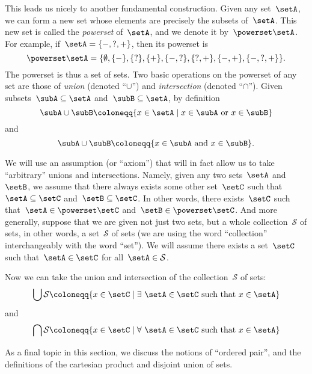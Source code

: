 {This leads us nicely to another fundamental construction.
Given any set~$\setA$, we can form a new set whose elements are precisely the subsets of~$\setA$.
This new set is called the \emph{powerset} of~$\setA$, and we denote it by~$\powerset \setA$.
For example, if~$\setA = \{ -, ?, + \}$, then its powerset is
\begin{equation}
\powerset \setA = \{ \emptyset, \{ - \}, \{ ? \}, \{ + \}, \{ -, ? \}, \{ ?, + \}, \{ -, +\}, \{ -, ?, + \} \}. 
\end{equation}
The powerset is thus a set of sets. 
Two basic operations on the powerset of any set are those of \emph{union} (denoted ``$\cup$'') and \emph{intersection} (denoted ``$\cap$'').
Given subsets~$\subA \subseteq \setA$ and~$\subB \subseteq \setA$, by definition
\begin{equation}
\subA \cup \subB \coloneqq \{ x \in \setA \mid x \in \subA \text{ or } x \in \subB \}
\end{equation}
and
\begin{equation}
\subA \cup \subB \coloneqq \{ x \in \subA \text{ and } x \in \subB \}.
\end{equation}


We will use an assumption (or ``axiom'') that will in fact allow us to take ``arbitrary'' unions and intersections. 
Namely, given any two sets~$\setA$ and~$\setB$, we assume that there always exists some other set~$\setC$ such that~$\setA \subseteq \setC$ and~$\setB \subseteq \setC$.
In other words, there exists~$\setC$ such that~$\setA \in \powerset \setC$ and~$\setB \in \powerset \setC$.
And more generally, suppose that we are given not just two sets, but a whole collection~$\mathcal{S}$ of sets, in other words, a set~$\mathcal{S}$ of sets (we are using the word ``collection'' interchangeably with the word ``set'').
We will assume there exists a set~$\setC$ such that~$\setA \in \setC$ for all~$\setA \in \mathcal{S}$.

Now we can take the union and intersection of the collection~$\mathcal{S}$ of sets:
\begin{equation}
\bigcup \mathcal{S} \coloneqq \{ x \in \setC \mid \exists \  \setA \in \setC \text{ such that } x \in \setA \}
\end{equation}
and
\begin{equation}
\bigcap \mathcal{S} \coloneqq \{ x \in \setC \mid \forall \  \setA \in \setC \text{ such that } x \in \setA \}
\end{equation}


As a final topic in this section, we discuss the notions of ``ordered pair'', and the definitions of the cartesian product and disjoint union of sets. 


}
